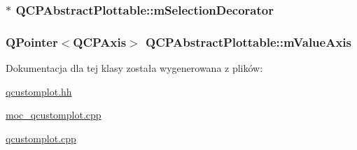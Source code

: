\subsubsection[{\texorpdfstring{m\+Selection\+Decorator}{mSelectionDecorator}}]{$\ast$ Q\+C\+P\+Abstract\+Plottable\+::m\+Selection\+Decorator\hspace{0.3cm}{\ttfamily [protected]}}\hypertarget{class_q_c_p_abstract_plottable_a0dbc731cab717f4ff67b4ca100c74046}{}\label{class_q_c_p_abstract_plottable_a0dbc731cab717f4ff67b4ca100c74046}
\subsubsection[{\texorpdfstring{m\+Value\+Axis}{mValueAxis}}]{\setlength{\rightskip}{0pt plus 5cm}Q\+Pointer$<${\bf Q\+C\+P\+Axis}$>$ Q\+C\+P\+Abstract\+Plottable\+::m\+Value\+Axis\hspace{0.3cm}{\ttfamily [protected]}}\hypertarget{class_q_c_p_abstract_plottable_a2901452ca4aea911a1827717934a4bda}{}\label{class_q_c_p_abstract_plottable_a2901452ca4aea911a1827717934a4bda}


Dokumentacja dla tej klasy została wygenerowana z plików\+:\begin{DoxyCompactItemize}
\item 
\hyperlink{qcustomplot_8hh}{qcustomplot.\+hh}\item 
\hyperlink{moc__qcustomplot_8cpp}{moc\+\_\+qcustomplot.\+cpp}\item 
\hyperlink{qcustomplot_8cpp}{qcustomplot.\+cpp}\end{DoxyCompactItemize}
